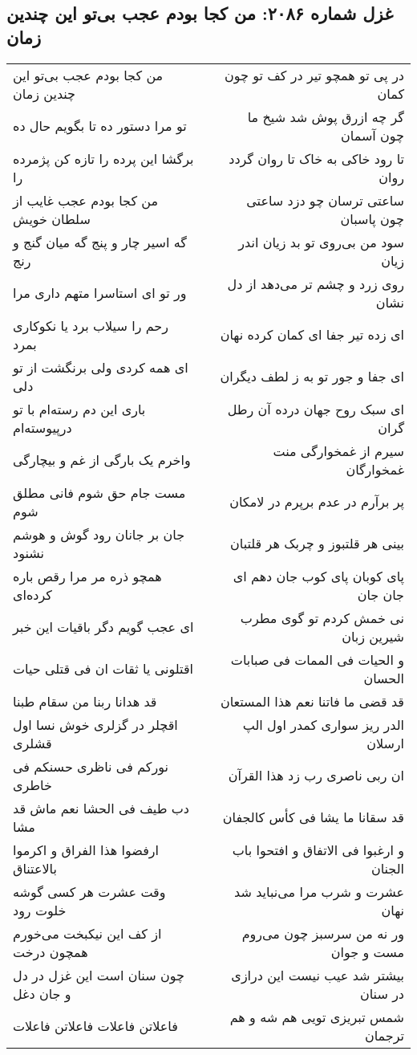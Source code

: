 \begin{center}
\section*{غزل شماره ۲۰۸۶: من کجا بودم عجب بی‌تو این چندین زمان}
\label{sec:2086}
\begin{longtable}{l p{0.5cm} r}
من کجا بودم عجب بی‌تو این چندین زمان
&&
در پی تو همچو تیر در کف تو چون کمان
\\
تو مرا دستور ده تا بگویم حال ده
&&
گر چه ازرق پوش شد شیخ ما چون آسمان
\\
برگشا این پرده را تازه کن پژمرده را
&&
تا رود خاکی به خاک تا روان گردد روان
\\
من کجا بودم عجب غایب از سلطان خویش
&&
ساعتی ترسان چو دزد ساعتی چون پاسبان
\\
گه اسیر چار و پنج گه میان گنج و رنج
&&
سود من بی‌روی تو بد زیان اندر زیان
\\
ور تو ای استاسرا متهم داری مرا
&&
روی زرد و چشم تر می‌دهد از دل نشان
\\
رحم را سیلاب برد یا نکوکاری بمرد
&&
ای زده تیر جفا ای کمان کرده نهان
\\
ای همه کردی ولی برنگشت از تو دلی
&&
ای جفا و جور تو به ز لطف دیگران
\\
باری این دم رسته‌ام با تو درپیوسته‌ام
&&
ای سبک روح جهان درده آن رطل گران
\\
واخرم یک بارگی از غم و بیچارگی
&&
سیرم از غمخوارگی منت غمخوارگان
\\
مست جام حق شوم فانی مطلق شوم
&&
پر برآرم در عدم برپرم در لامکان
\\
جان بر جانان رود گوش و هوشم نشنود
&&
بینی هر قلتبوز و چربک هر قلتبان
\\
همچو ذره مر مرا رقص باره کرده‌ای
&&
پای کوبان پای کوب جان دهم ای جان جان
\\
ای عجب گویم دگر باقیات این خبر
&&
نی خمش کردم تو گوی مطرب شیرین زبان
\\
اقتلونی یا ثقات ان فی قتلی حیات
&&
و الحیات فی الممات فی صبابات الحسان
\\
قد هدانا ربنا من سقام طبنا
&&
قد قضی ما فاتنا نعم هذا المستعان
\\
اقچلر در گزلری خوش نسا اول قشلری
&&
الدر ریز سواری کمدر اول الپ ارسلان
\\
نورکم فی ناظری حسنکم فی خاطری
&&
ان ربی ناصری رب زد هذا القرآن
\\
دب طیف فی الحشا نعم ماش قد مشا
&&
قد سقانا ما یشا فی کأس کالجفان
\\
ارفضوا هذا الفراق و اکرموا بالاعتناق
&&
و ارغبوا فی الاتفاق و افتحوا باب الجنان
\\
وقت عشرت هر کسی گوشه خلوت رود
&&
عشرت و شرب مرا می‌نباید شد نهان
\\
از کف این نیکبخت می‌خورم همچون درخت
&&
ور نه من سرسبز چون می‌روم مست و جوان
\\
چون سنان است این غزل در دل و جان دغل
&&
بیشتر شد عیب نیست این درازی در سنان
\\
فاعلاتن فاعلات فاعلاتن فاعلات
&&
شمس تبریزی تویی هم شه و هم ترجمان
\\
\end{longtable}
\end{center}
